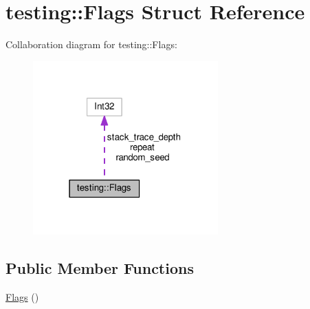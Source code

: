 \hypertarget{structtesting_1_1Flags}{}\section{testing\+:\+:Flags Struct Reference}
\label{structtesting_1_1Flags}


Collaboration diagram for testing\+:\+:Flags\+:
\nopagebreak
\begin{figure}[H]
\begin{center}
\leavevmode
\includegraphics[width=202pt]{structtesting_1_1Flags__coll__graph}
\end{center}
\end{figure}
\subsection*{Public Member Functions}
\begin{DoxyCompactItemize}
\item 
\hyperlink{structtesting_1_1Flags_a41dc8942bec08ebc7f74dee545e6ad7e}{Flags} ()
\end{DoxyCompactItemize}
